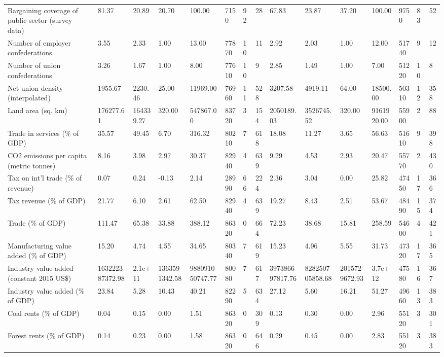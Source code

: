 \begin{longtable}{lllllllllllllll}
\addlinespace
Bargaining coverage of public sector (survey data) & 81.37 & 20.89 & 20.70 & 100.00 & 7150 & 92 & 28 & 67.83 & 23.87 & 37.20 & 100.00 & 9750 & 83 & 52\\
Number of employer confederations & 3.55 & 2.33 & 1.00 & 13.00 & 77870 & 10 & 11 & 2.92 & 2.03 & 1.00 & 12.00 & 51740 & 9 & 12\\
Number of union confederations & 3.26 & 1.67 & 1.00 & 8.00 & 77610 & 10 & 9 & 2.85 & 1.49 & 1.00 & 7.00 & 51220 & 10 & 8\\
Net union density (interpolated) & 1955.67 & 2230.46 & 25.00 & 11969.00 & 76960 & 11 & 528 & 3207.58 & 4919.11 & 64.00 & 18500.00 & 50310 & 12 & 358\\
Land area (sq. km) & 176277.61 & 164339.27 & 320.00 & 547867.00 & 83720 & 3 & 154 & 2050189.03 & 3526745.52 & 320.00 & 9161920.00 & 55900 & 2 & 88\\
\addlinespace
Trade in services (\% of GDP) & 35.57 & 49.45 & 6.70 & 316.32 & 80210 & 7 & 618 & 18.08 & 11.27 & 3.65 & 56.63 & 51610 & 9 & 398\\
CO2 emissions per capita (metric tonnes) & 8.16 & 3.98 & 2.97 & 30.37 & 82940 & 4 & 639 & 9.29 & 4.53 & 2.93 & 20.47 & 55770 & 2 & 430\\
Tax on int'l trade (\% of revenue) & 0.07 & 0.24 & -0.13 & 2.14 & 28990 & 66 & 224 & 2.36 & 3.04 & 0.00 & 25.82 & 47450 & 17 & 366\\
Tax revenue (\% of GDP) & 21.77 & 6.10 & 2.61 & 62.50 & 82940 & 4 & 639 & 19.27 & 8.43 & 2.51 & 53.67 & 48490 & 15 & 374\\
Trade (\% of GDP) & 111.47 & 65.38 & 33.88 & 388.12 & 86320 & 0 & 664 & 72.23 & 38.68 & 15.81 & 258.59 & 54600 & 4 & 421\\
\addlinespace
Manufacturing value added (\% of GDP) & 15.20 & 4.74 & 4.55 & 34.65 & 80340 & 7 & 619 & 15.23 & 4.96 & 5.55 & 31.73 & 47320 & 17 & 365\\
Industry value added (constant 2015 US\$) & 163222387372.98 & 2.1e+11 & 1363591342.58 & 988091050747.77 & 80080 & 7 & 617 & 397386697817.76 & 828250705858.68 & 2015729672.93 & 3.7e+12 & 47580 & 16 & 367\\
Industry value added (\% of GDP) & 23.84 & 5.28 & 10.43 & 40.21 & 82290 & 5 & 634 & 27.12 & 5.60 & 16.21 & 51.27 & 49660 & 13 & 383\\
Coal rents (\% of GDP) & 0.04 & 0.15 & 0.00 & 1.51 & 86320 & 0 & 309 & 0.13 & 0.30 & 0.00 & 2.96 & 55120 & 3 & 301\\
Forest rents (\% of GDP) & 0.14 & 0.23 & 0.00 & 1.58 & 86320 & 0 & 646 & 0.29 & 0.45 & 0.00 & 2.83 & 55120 & 3 & 383\\

\end{longtable}
